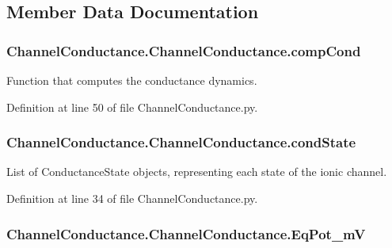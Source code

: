 \subsection{Member Data Documentation}
\hypertarget{class_channel_conductance_1_1_channel_conductance_a0a91eec3fa2b1dfc66c6379943a5907f}{
\subsubsection[{comp\-Cond}]{\setlength{\rightskip}{0pt plus 5cm}Channel\-Conductance.\-Channel\-Conductance.\-comp\-Cond}}\label{class_channel_conductance_1_1_channel_conductance_a0a91eec3fa2b1dfc66c6379943a5907f}


Function that computes the conductance dynamics. 



Definition at line 50 of file Channel\-Conductance.\-py.

\hypertarget{class_channel_conductance_1_1_channel_conductance_a628553cbc1efd93b30b0a15afd4417d9}{
\subsubsection[{cond\-State}]{\setlength{\rightskip}{0pt plus 5cm}Channel\-Conductance.\-Channel\-Conductance.\-cond\-State}}\label{class_channel_conductance_1_1_channel_conductance_a628553cbc1efd93b30b0a15afd4417d9}


List of Conductance\-State objects, representing each state of the ionic channel. 



Definition at line 34 of file Channel\-Conductance.\-py.

\hypertarget{class_channel_conductance_1_1_channel_conductance_a654a73b6cd5853b509e7f7fba060572b}{
\subsubsection[{Eq\-Pot\-\_\-m\-V}]{\setlength{\rightskip}{0pt plus 5cm}Channel\-Conductance.\-Channel\-Conductance.\-Eq\-Pot\-\_\-m\-V}}\label{class_channel_conductance_1_1_channel_conductance_a654a73b6cd5853b509e7f7fba060572b}


